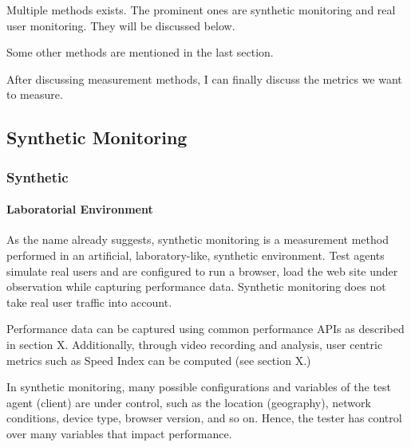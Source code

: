 
Multiple methods exists.
The prominent ones are synthetic monitoring and real user monitoring.
They will be discussed below.

Some other methods are mentioned in the last section.

After discussing measurement methods, I can finally discuss the metrics we want to measure.










\subsection{Synthetic Monitoring}


\subsubsection{Synthetic}

\paragraph{Laboratorial Environment}

As the name already suggests, synthetic monitoring is a measurement method performed in an artificial, laboratory-like, synthetic environment.
Test agents simulate real users and are configured to run a browser, load the web site under observation while capturing performance data.
Synthetic monitoring does not take real user traffic into account. %

Performance data can be captured using common performance APIs as described in section X.
Additionally, through video recording and analysis,  user centric metrics such as Speed Index can be computed (see section X.) %

In synthetic monitoring, many possible configurations and variables of the test agent (client) are under control, such as the location (geography), network conditions, device type, browser version, and so on. %
Hence, the tester has control over many variables that impact performance.

